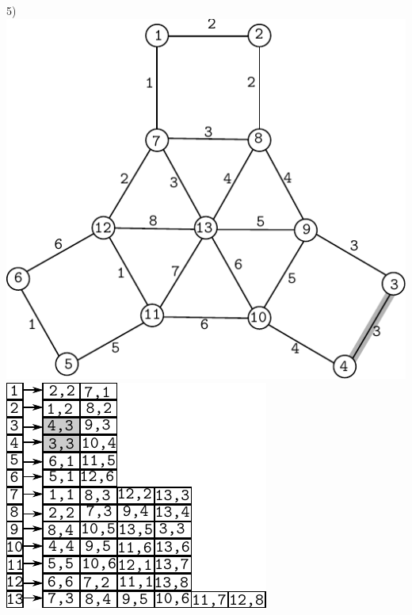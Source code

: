 \documentclass{article}
\begin{document}
\begin{center}
5)\includegraphics[scale=0.6]{bottleneck/g5}
\hspace{5mm}
\includegraphics[scale=0.9]{bottleneck/l5}
\end{center}
\end{document}
